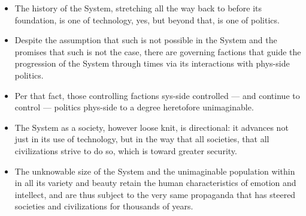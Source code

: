 \begin{itemize}
\tightlist
\item
  The history of the System, stretching all the way back to before its foundation, is one of technology, yes, but beyond that, is one of politics.
\item
  Despite the assumption that such is not possible in the System and the promises that such is not the case, there are governing factions that guide the progression of the System through times via its interactions with phys-side politics.
\item
  Per that fact, those controlling factions sys-side controlled — and continue to control — politics phys-side to a degree heretofore unimaginable.
\item
  The System as a society, however loose knit, is directional: it advances not just in its use of technology, but in the way that all societies, that all civilizations strive to do so, which is toward greater security.
\item
  The unknowable size of the System and the unimaginable population within in all its variety and beauty retain the human characteristics of emotion and intellect, and are thus subject to the very same propaganda that has steered societies and civilizations for thousands of years.
\end{itemize}
